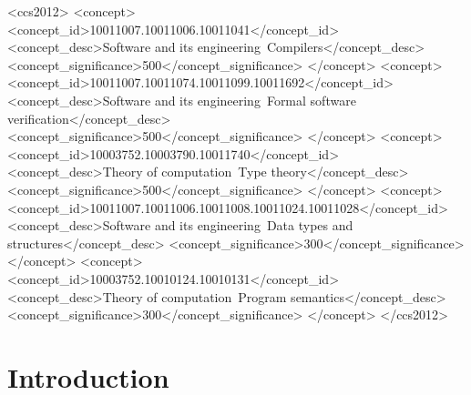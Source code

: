\documentclass[acmsmall]{acmart}
\begin{document}
\begin{CCSXML}
<ccs2012>
 <concept>
  <concept_id>10011007.10011006.10011041</concept_id>
  <concept_desc>Software and its engineering~Compilers</concept_desc>
  <concept_significance>500</concept_significance>
 </concept>
 <concept>
  <concept_id>10011007.10011074.10011099.10011692</concept_id>
  <concept_desc>Software and its engineering~Formal software verification</concept_desc>
  <concept_significance>500</concept_significance>
 </concept>
 <concept>
  <concept_id>10003752.10003790.10011740</concept_id>
  <concept_desc>Theory of computation~Type theory</concept_desc>
  <concept_significance>500</concept_significance>
 </concept>
 <concept>
  <concept_id>10011007.10011006.10011008.10011024.10011028</concept_id>
  <concept_desc>Software and its engineering~Data types and structures</concept_desc>
  <concept_significance>300</concept_significance>
 </concept>
 <concept>
  <concept_id>10003752.10010124.10010131</concept_id>
  <concept_desc>Theory of computation~Program semantics</concept_desc>
  <concept_significance>300</concept_significance>
 </concept>
</ccs2012>
\end{CCSXML}



\maketitle

\section{Introduction}
\end{document}
